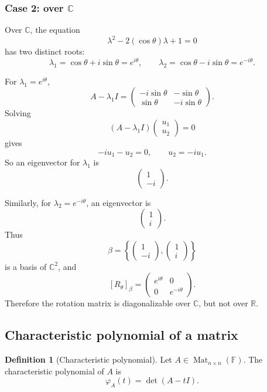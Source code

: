 \documentclass[11pt]{article}
\newcommand{\F}{\mathbb F}
\newcommand{\R}{\mathbb R}
\newcommand{\C}{\mathbb C}
\newcommand{\Mat}{\operatorname{Mat}}
\theoremstyle{definition}
\newtheorem{definition}{Definition}[section]
\theoremstyle{plain}
\begin{document}
\subsubsection*{Case 2: over $\C$}

Over $\C$, the equation
\[
\lambda^2-2(\cos\theta)\lambda+1=0
\]
has two distinct roots:
\[
\lambda_1=\cos\theta+i\sin\theta=e^{i\theta},
\qquad
\lambda_2=\cos\theta-i\sin\theta=e^{-i\theta}.
\]

For $\lambda_1=e^{i\theta}$,
\[
A-\lambda_1 I
=\begin{pmatrix}
-i\sin\theta&-\sin\theta\\
\sin\theta&-i\sin\theta
\end{pmatrix}.
\]
Solving
\[
(A-\lambda_1 I)
\begin{pmatrix}u_1\\u_2\end{pmatrix}=0
\]
gives
\[
-i u_1-u_2=0,
\qquad
u_2=-iu_1.
\]
So an eigenvector for $\lambda_1$ is
\[
\begin{pmatrix}1\\-i\end{pmatrix}.
\]

Similarly, for $\lambda_2=e^{-i\theta}$, an eigenvector is
\[
\begin{pmatrix}1\\i\end{pmatrix}.
\]
Thus
\[
\beta=
\left\{
\begin{pmatrix}1\\-i\end{pmatrix},
\begin{pmatrix}1\\i\end{pmatrix}
\right\}
\]
is a basis of $\C^2$, and
\[
[R_\theta]_{\beta}
=\begin{pmatrix}
e^{i\theta}&0\\
0&e^{-i\theta}
\end{pmatrix}.
\]
Therefore the rotation matrix is diagonalizable over $\C$, but not over $\R$.

\subsection{Characteristic polynomial of a matrix}

\begin{definition}[Characteristic polynomial]
Let $A\in\Mat_{n\times n}(\F)$.  The characteristic polynomial of $A$ is
\[
\varphi_A(t)=\det(A-tI).
\]
\end{definition}
\end{document}

